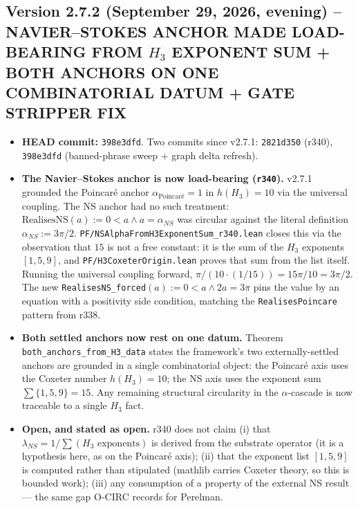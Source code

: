 \subsection*{Version 2.7.2 (September 29, 2026, evening) -- NAVIER--STOKES ANCHOR MADE LOAD-BEARING FROM $H_3$ EXPONENT SUM + BOTH ANCHORS ON ONE COMBINATORIAL DATUM + GATE STRIPPER FIX}
\begin{itemize}

\item \textbf{HEAD commit:} \texttt{398e3dfd}. Two commits since v2.7.1:
\texttt{2821d350} (r340), \texttt{398e3dfd} (banned-phrase sweep + graph
delta refresh).

\item \textbf{The Navier--Stokes anchor is now load-bearing
(\texttt{r340}).} v2.7.1 grounded the Poincar\'e anchor
$\alpha_{\text{Poincar\'e}} = 1$ in $h(H_3) = 10$ via the universal
coupling. The NS anchor had no such treatment:
$\mathrm{RealisesNS}(a) := 0 < a \wedge a = \alpha_{NS}$ was circular
against the literal definition $\alpha_{NS} := 3\pi/2$.
\texttt{PF/NSAlphaFromH3ExponentSum\_r340.lean} closes this via the
observation that $15$ is not a free constant: it is the sum of the $H_3$
exponents $[1, 5, 9]$, and \texttt{PF/H3CoxeterOrigin.lean} proves that
sum from the list itself. Running the universal coupling forward,
$\pi / (10 \cdot (1/15)) = 15\pi/10 = 3\pi/2$. The new
\texttt{RealisesNS\_forced}$(a) := 0 < a \wedge 2a = 3\pi$ pins the value
by an equation with a positivity side condition, matching the
\texttt{RealisesPoincare} pattern from r338.

\item \textbf{Both settled anchors now rest on one datum.} Theorem
\texttt{both\_anchors\_from\_H3\_data} states the framework's two
externally-settled anchors are grounded in a single combinatorial
object: the Poincar\'e axis uses the Coxeter number $h(H_3) = 10$; the
NS axis uses the exponent sum $\sum \{1, 5, 9\} = 15$. Any remaining
structural circularity in the $\alpha$-cascade is now traceable to a
single $H_3$ fact.

\item \textbf{Open, and stated as open.} r340 does not claim (i) that
$\lambda_{NS} = 1/\sum(H_3\text{ exponents})$ is derived from the
substrate operator (it is a hypothesis here, as on the Poincar\'e axis);
(ii) that the exponent list $[1, 5, 9]$ is computed rather than
stipulated (mathlib carries Coxeter theory, so this is bounded work);
(iii) any consumption of a property of the external NS result --- the
same gap O-CIRC records for Perelman.


\end{itemize}
